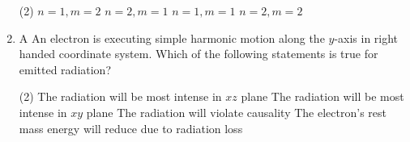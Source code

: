 \begin{enumerate}
{}
 \begin{tasks}(2)
	\task[\textbf{a.}]$n=1, m=2$
	\task[\textbf{b.}]$n=2, m=1$
	\task[\textbf{c.}]$n=1, m=1$
	\task[\textbf{d.}]$n=2, m=2$
\end{tasks}
\item A An electron is executing simple harmonic motion along the $y$-axis in right handed coordinate system. Which of the following statements is true for emitted radiation?
{}
 \begin{tasks}(2)
	\task[\textbf{a.}]The radiation will be most intense in $x z$ plane
	\task[\textbf{b.}] The radiation will be most intense in $x y$ plane
	\task[\textbf{c.}]The radiation will violate causality
	\task[\textbf{d.}] The electron's rest mass energy will reduce due to radiation loss
\end{tasks}
\end{enumerate}



